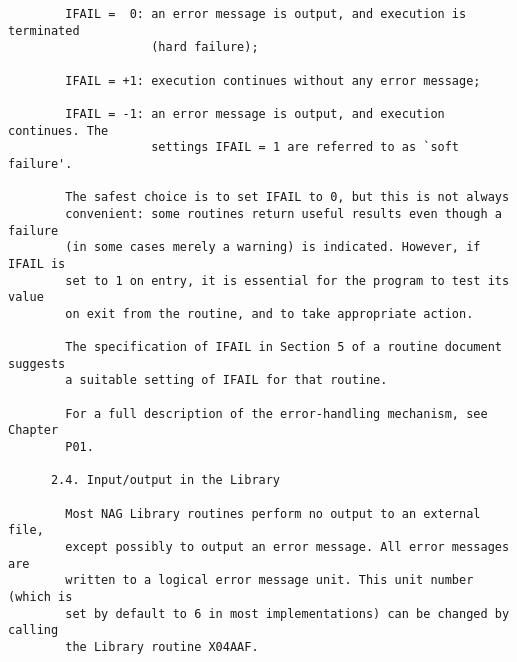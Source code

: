 \begin{small}
\begin{verbatim}
        IFAIL =  0: an error message is output, and execution is terminated       
                    (hard failure);                                               
                                                                                  
        IFAIL = +1: execution continues without any error message;                
                                                                                  
        IFAIL = -1: an error message is output, and execution continues. The      
                    settings IFAIL = 1 are referred to as `soft failure'.         
                                                                                  
        The safest choice is to set IFAIL to 0, but this is not always            
        convenient: some routines return useful results even though a failure     
        (in some cases merely a warning) is indicated. However, if IFAIL is       
        set to 1 on entry, it is essential for the program to test its value      
        on exit from the routine, and to take appropriate action.                 
                                                                                  
        The specification of IFAIL in Section 5 of a routine document suggests    
        a suitable setting of IFAIL for that routine.                             
                                                                                  
        For a full description of the error-handling mechanism, see Chapter       
        P01.                                                                      
                                                                                  
      2.4. Input/output in the Library                                            
                                                                                  
        Most NAG Library routines perform no output to an external file,          
        except possibly to output an error message. All error messages are        
        written to a logical error message unit. This unit number (which is       
        set by default to 6 in most implementations) can be changed by calling    
        the Library routine X04AAF.                                               
                                                                                  

\end{verbatim}
\end{small}
